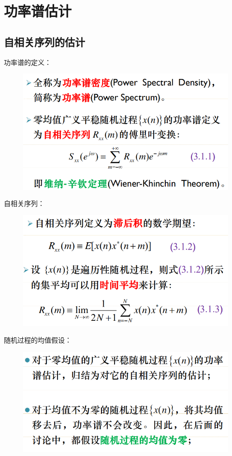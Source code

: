 \documentclass[UTF8]{ctexart} %
\begin{document}
	\section{功率谱估计}
		\subsection{自相关序列的估计}
				功率谱的定义：
					\begin{figure}[H]
						\centering\includegraphics[scale=0.4]{66.png}
					\end{figure}
				自相关序列：
					\begin{figure}[H]
						\centering\includegraphics[scale=0.4]{67.png}
					\end{figure}	
				随机过程的均值假设：
				\begin{figure}[H]
					\centering\includegraphics[scale=0.4]{68.png}
				\end{figure}
\end{document}
